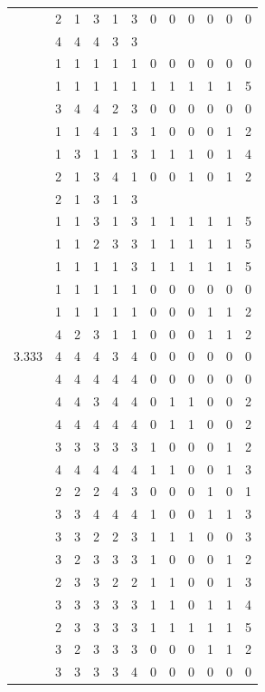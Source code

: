 \documentclass[]{msu-thesis}
\theoremstyle{definition}
\theoremstyle{definition}
\theoremstyle{definition}
\theoremstyle{remark}
\begin{document}
\begin{table}
{\begin{tabular}[t]{rrrrrrrrrrrr}
 & 2 & 1 & 3 & 1 & 3 & 0 & 0 & 0 & 0 & 0 & 0\\
 & 4 & 4 & 4 & 3 & 3 &  &  &  &  &  & \\
 & 1 & 1 & 1 & 1 & 1 & 0 & 0 & 0 & 0 & 0 & 0\\
 & 1 & 1 & 1 & 1 & 1 & 1 & 1 & 1 & 1 & 1 & 5\\
 & 3 & 4 & 4 & 2 & 3 & 0 & 0 & 0 & 0 & 0 & 0\\
 & 1 & 1 & 4 & 1 & 3 & 1 & 0 & 0 & 0 & 1 & 2\\
 & 1 & 3 & 1 & 1 & 3 & 1 & 1 & 1 & 0 & 1 & 4\\
 & 2 & 1 & 3 & 4 & 1 & 0 & 0 & 1 & 0 & 1 & 2\\
 & 2 & 1 & 3 & 1 & 3 &  &  &  &  &  & \\
 & 1 & 1 & 3 & 1 & 3 & 1 & 1 & 1 & 1 & 1 & 5\\
 & 1 & 1 & 2 & 3 & 3 & 1 & 1 & 1 & 1 & 1 & 5\\
 & 1 & 1 & 1 & 1 & 3 & 1 & 1 & 1 & 1 & 1 & 5\\
 & 1 & 1 & 1 & 1 & 1 & 0 & 0 & 0 & 0 & 0 & 0\\
 & 1 & 1 & 1 & 1 & 1 & 0 & 0 & 0 & 1 & 1 & 2\\
 & 4 & 2 & 3 & 1 & 1 & 0 & 0 & 0 & 1 & 1 & 2\\
3.333 & 4 & 4 & 4 & 3 & 4 & 0 & 0 & 0 & 0 & 0 & 0\\
 & 4 & 4 & 4 & 4 & 4 & 0 & 0 & 0 & 0 & 0 & 0\\
 & 4 & 4 & 3 & 4 & 4 & 0 & 1 & 1 & 0 & 0 & 2\\
 & 4 & 4 & 4 & 4 & 4 & 0 & 1 & 1 & 0 & 0 & 2\\
 & 3 & 3 & 3 & 3 & 3 & 1 & 0 & 0 & 0 & 1 & 2\\
 & 4 & 4 & 4 & 4 & 4 & 1 & 1 & 0 & 0 & 1 & 3\\
 & 2 & 2 & 2 & 4 & 3 & 0 & 0 & 0 & 1 & 0 & 1\\
 & 3 & 3 & 4 & 4 & 4 & 1 & 0 & 0 & 1 & 1 & 3\\
 & 3 & 3 & 2 & 2 & 3 & 1 & 1 & 1 & 0 & 0 & 3\\
 & 3 & 2 & 3 & 3 & 3 & 1 & 0 & 0 & 0 & 1 & 2\\
 & 2 & 3 & 3 & 2 & 2 & 1 & 1 & 0 & 0 & 1 & 3\\
 & 3 & 3 & 3 & 3 & 3 & 1 & 1 & 0 & 1 & 1 & 4\\
 & 2 & 3 & 3 & 3 & 3 & 1 & 1 & 1 & 1 & 1 & 5\\
 & 3 & 2 & 3 & 3 & 3 & 0 & 0 & 0 & 1 & 1 & 2\\
 & 3 & 3 & 3 & 3 & 4 & 0 & 0 & 0 & 0 & 0 & 0\\

\end{tabular}}
\end{table}
\end{document}
